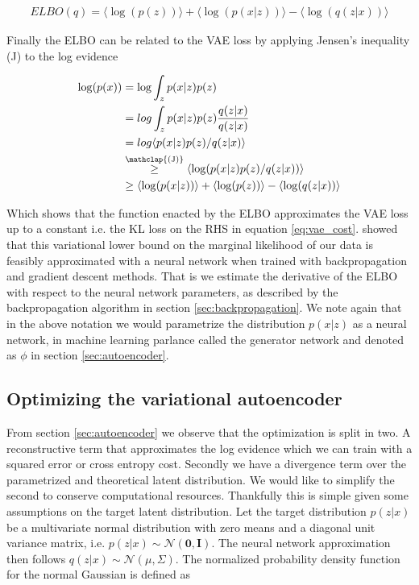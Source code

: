 \begin{align}
ELBO(q) = \langle \log(p(z)) \rangle +  \langle \log(p(x|z)) \rangle - \langle \log(q(z|x)) \rangle
\end{align}

\noindent Finally the ELBO can be related to the VAE loss by applying Jensen's inequality (J) to the log evidence 

\begin{align}
\log (p(x)) &= \log \int_z p(x|z) p(z) \\
&= log \int _z p(x|z) p(z) \frac{q(z|x)}{q(z|x)} \\
& = log \langle p(x|z) p(z)/ q(z|x) \rangle \\
&  \stackrel{\mathclap{\text{(J)}}}{\geq} \langle \log (p(x|z) p(z)/ q(z|x))\rangle \\
& \geq \langle \log(p(x|z))\rangle + \langle \log(p(z))\rangle  - \langle \log(q(z|x))\rangle 
\end{align}

\noindent Which shows that the function enacted by the ELBO approximates the VAE loss up to a constant i.e. the KL loss on the RHS in equation \ref{eq:vae_cost}. \citet{Kingma2013} showed that this variational lower bound on the marginal likelihood of our data is feasibly approximated with a neural network when trained with backpropagation and gradient descent methods. That is we estimate the derivative of the ELBO with respect to the neural network parameters, as described by the backpropagation algorithm in section \ref{sec:backpropagation}. We note again that in the above notation we would parametrize the distribution $p(x|z)$ as a neural network, in machine learning parlance called the generator network and denoted as $\phi$ in section \ref{sec:autoencoder}. 

\subsection{Optimizing the variational autoencoder}

From section \ref{sec:autoencoder} we observe that the optimization is split in two. A reconstructive term that approximates the log evidence which we can train with a squared error or cross entropy cost. Secondly we have a divergence term over the parametrized and theoretical latent distribution. We would like to simplify the second to conserve computational resources. Thankfully this is simple given some assumptions on the target latent distribution. Let the target distribution $p(z | x) $ be a multivariate normal distribution with zero means and a diagonal unit variance matrix, i.e. $p(z | x) \sim  \mathcal{N}(\mathbf{0}, \mathbf{I})$. The neural network approximation then follows $q(z | x) \sim \mathcal{N}(\mu, \Sigma)$. The normalized probability density function for the normal Gaussian is defined as 

